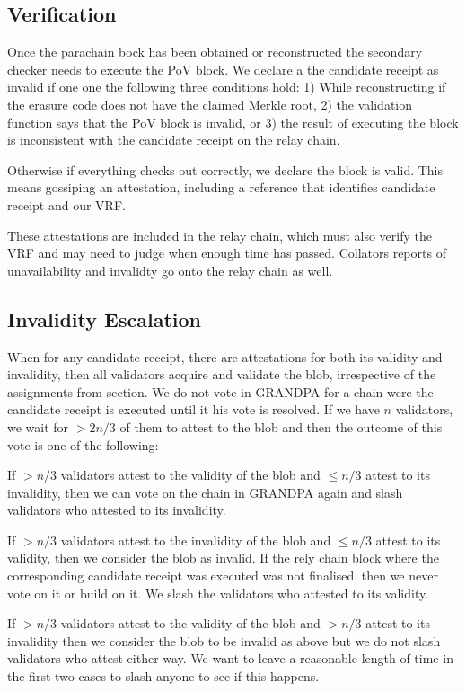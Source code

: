 \subsection{Verification}

Once the parachain bock has been obtained or reconstructed the secondary checker needs to execute the PoV block.
We declare a the candidate receipt as invalid if one one the following three conditions hold: 1) While reconstructing if the erasure code does not have the claimed Merkle root, 2) the validation function says that the PoV block is invalid, or 3) the result  of executing the block is inconsistent with the candidate receipt on the relay chain.

Otherwise if everything checks out correctly, we declare the block is valid. This means gossiping an attestation, including a reference that identifies candidate receipt and our VRF. 

These attestations are included in the relay chain, which must also verify the VRF and may need to judge when enough time has passed. Collators reports of unavailability and invalidty go onto the relay chain as well.

\subsection{Invalidity Escalation}\label{escalation}

When for any candidate receipt, there are attestations for both its validity and invalidity, then all validators acquire and validate the blob, irrespective of the assignments from section. We do not vote in GRANDPA for a chain were the candidate receipt is executed until it his vote is resolved. If we have $n$ validators, we wait for $>2n/3$ of them to attest to the blob and then the outcome of this vote is one of the following:

If $>n/3$ validators attest to the validity of the blob and $\leq n/3$ attest to its invalidity, then we can vote on the chain in GRANDPA again and slash validators who attested to its invalidity.

If $>n/3$ validators attest to the invalidity of the blob and $\leq n/3$ attest to its validity, then we consider the blob as invalid. If the rely chain block where the corresponding candidate receipt was executed was not finalised, then we never vote on it or build on it. We slash the validators who attested to its validity.

If $>n/3$ validators attest to the validity of the blob and $>n/3$ attest to its invalidity then we consider the blob to be invalid as above but we do not slash validators who attest either way. We want to leave a reasonable length of time in the first two cases to slash anyone to see if this happens.

